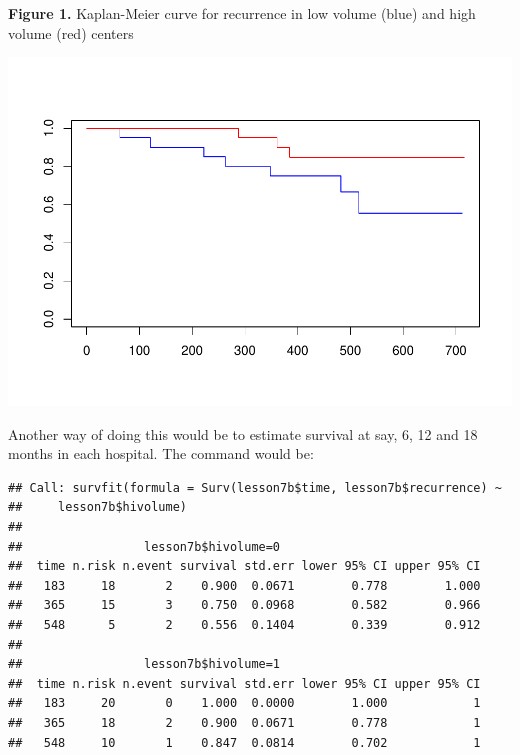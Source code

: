 \documentclass[]{book}
\newenvironment{Shaded}{\begin{snugshade}}{\end{snugshade}}
\newcommand{\DataTypeTok}[1]{\textcolor[rgb]{0.13,0.29,0.53}{#1}}
\newcommand{\DecValTok}[1]{\textcolor[rgb]{0.00,0.00,0.81}{#1}}
\newcommand{\KeywordTok}[1]{\textcolor[rgb]{0.13,0.29,0.53}{\textbf{#1}}}
\newcommand{\NormalTok}[1]{#1}
\newcommand{\OperatorTok}[1]{\textcolor[rgb]{0.81,0.36,0.00}{\textbf{#1}}}
\newcommand{\StringTok}[1]{\textcolor[rgb]{0.31,0.60,0.02}{#1}}
\begin{document}
\textbf{Figure 1.} Kaplan-Meier curve for recurrence in low volume
(blue) and high volume (red) centers

\includegraphics{09-answers_files/figure-latex/week7q-1.pdf}

Another way of doing this would be to estimate survival at say, 6, 12
and 18 months in each hospital. The command would be:

\begin{Shaded}
\end{Shaded}

\begin{verbatim}
## Call: survfit(formula = Surv(lesson7b$time, lesson7b$recurrence) ~ 
##     lesson7b$hivolume)
## 
##                 lesson7b$hivolume=0 
##  time n.risk n.event survival std.err lower 95% CI upper 95% CI
##   183     18       2    0.900  0.0671        0.778        1.000
##   365     15       3    0.750  0.0968        0.582        0.966
##   548      5       2    0.556  0.1404        0.339        0.912
## 
##                 lesson7b$hivolume=1 
##  time n.risk n.event survival std.err lower 95% CI upper 95% CI
##   183     20       0    1.000  0.0000        1.000            1
##   365     18       2    0.900  0.0671        0.778            1
##   548     10       1    0.847  0.0814        0.702            1
\end{verbatim}
\end{document}
